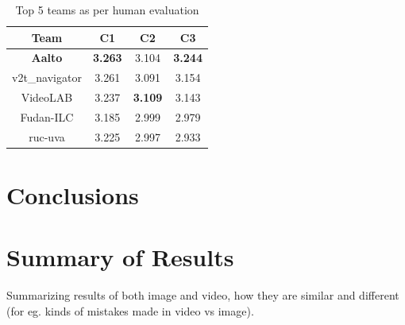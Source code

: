\begin{table}[th]
        \caption{Top 5 teams as per human evaluation}
  \centering
  \newcommand{\bs}{\small\bf}
  \begin{tabular}{||c|c|c|c|}
    \hline\hline
    \bf Team  &\bs C1 &\bs C2 &\bs C3 \\\hline\hline
    \bf Aalto      & \bf3.263 & 3.104 & \bf3.244\\
    v2t\_navigator & 3.261 & 3.091 & 3.154 \\
    VideoLAB       & 3.237 & \bf3.109 & 3.143 \\
    Fudan-ILC      & 3.185 & 2.999 & 2.979 \\
    ruc-uva        & 3.225 & 2.997 & 2.933 \\\hline
    \hline
  \end{tabular}
  \label{tab:resultsTestHum}
\end{table}


\section{Conclusions}


\section{Summary of Results}
Summarizing results of both image and video, how they are similar and different
(for eg. kinds of mistakes made in video vs image).
